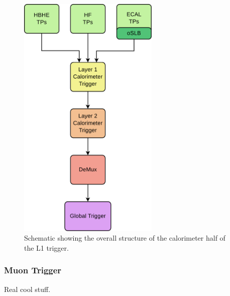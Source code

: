 \begin{figure}[h]
\begin{center}
\includegraphics[width=0.6\textwidth]{Figures/Trigger/caloL1T.pdf}
\end{center}
\caption{Schematic showing the overall structure of the calorimeter half of the L1 trigger.}
\label{fig:caloL1T}
\end{figure}

\subsubsection{Muon Trigger}
Real cool stuff.

